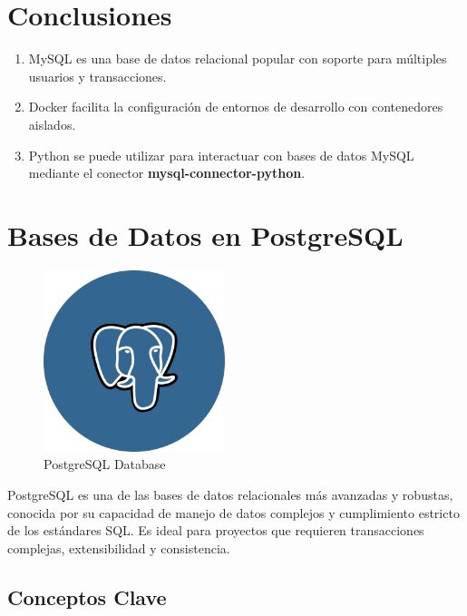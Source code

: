 \documentclass[
  a4paper,
  DIV=11,
  numbers=noendperiod,
  onepage,
  openany]{scrreprt}
\providecommand{\tightlist}{%
  \setlength{\itemsep}{0pt}\setlength{\parskip}{0pt}}\usepackage{longtable,booktabs,array}
\begin{document}
\chapter{Conclusiones}\label{conclusiones-9}

\begin{enumerate}
\def\labelenumi{\arabic{enumi}.}
\tightlist
\item
  MySQL es una base de datos relacional popular con soporte para
  múltiples usuarios y transacciones.
\item
  Docker facilita la configuración de entornos de desarrollo con
  contenedores aislados.
\item
  Python se puede utilizar para interactuar con bases de datos MySQL
  mediante el conector \textbf{mysql-connector-python}.
\end{enumerate}

\chapter{Bases de Datos en
PostgreSQL}\label{bases-de-datos-en-postgresql}

\begin{figure}[H]

{\centering \includegraphics[width=2.08333in,height=\textheight,keepaspectratio]{unidades/unidad6/./images/postgresql_logo.png}

}

\caption{PostgreSQL Database}

\end{figure}%

PostgreSQL es una de las bases de datos relacionales más avanzadas y
robustas, conocida por su capacidad de manejo de datos complejos y
cumplimiento estricto de los estándares SQL. Es ideal para proyectos que
requieren transacciones complejas, extensibilidad y consistencia.

\section{Conceptos Clave}\label{conceptos-clave-13}
\end{document}
